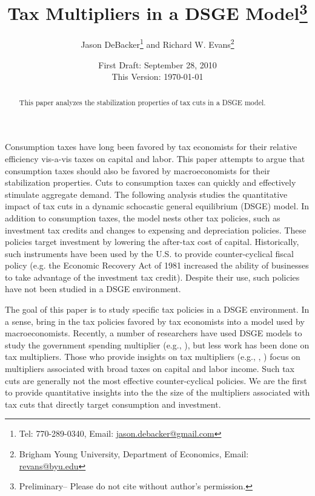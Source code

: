 \documentclass[article,11pt,letterpaper,fleqn]{article}
\author{Jason DeBacker\thanks{Tel: 770-289-0340, Email: \href{mailto: jason.debacker@gmail.com}{jason.debacker@gmail.com}} and Richard W. Evans\thanks{Brigham Young University,  Department of Economics, Email: \href{mailto: revans@byu.edu}{revans@byu.edu}}}
\title{Tax Multipliers in a DSGE Model\thanks{Preliminary-- Please do not cite without author's permission.}}
\date{First Draft: September 28, 2010\\ This Version: \today}
\theoremstyle{definition}
\numberwithin{equation}{section}
\newcommand{\cn}{\citeasnoun} %
\begin{document}

\maketitle



\begin{abstract}
This paper analyzes the stabilization properties of tax cuts in a DSGE model.  
\end{abstract}








Consumption taxes have long been favored by tax economists for their relative efficiency vis-a-vis taxes on capital and labor.  This paper attempts to argue that consumption taxes should also be favored by macroeconomists for their stabilization properties.  Cuts to consumption taxes can quickly and effectively stimulate aggregate demand. The following analysis studies the quantitative impact of tax cuts in a dynamic schocastic general equilibrium (DSGE) model.  In addition to consumption taxes, the model nests other tax policies, such as investment tax credits and changes to expensing and depreciation policies.  These policies target investment by lowering the after-tax cost of capital.  Historically, such instruments have been used by the U.S. to provide counter-cyclical fiscal policy (e.g. the Economic Recovery Act of 1981 increased the ability of businesses to take advantage of the investment tax credit).  Despite their use, such policies have not been studied in a DSGE environment.

The goal of this paper is to study specific tax policies in a DSGE environment.  In a sense, bring in the tax policies favored by tax economists into a model used by macroeconomists.  Recently, a number of researchers have used DSGE models to study the government spending multiplier (e.g., \cn{CER2010}), but less work has been done on tax multipliers.  Those who provide insights on tax multipliers (e.g., \cn{Zubairy2010}, \cn{IMF2010}) focus on multipliers associated with broad taxes on capital and labor income.  Such tax cuts are generally not the most effective counter-cyclical policies.  We are the first to provide quantitative insights into the the size of the multipliers associated with tax cuts that directly target consumption and investment.
\end{document}
